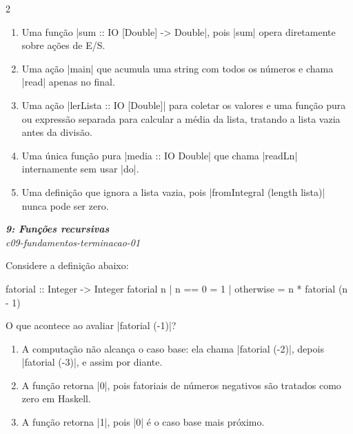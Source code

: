 \documentclass[a4paper,10pt,brazil]{article}
\begin{document}
\begin{multicols}{2}
\begin{enumerate}
  \item Uma função \haskellinline|sum :: IO [Double] -> Double|, pois \haskellinline|sum| opera diretamente sobre ações de E/S.

  \item Uma ação \haskellinline|main| que acumula uma string com todos os números e chama \haskellinline|read| apenas no final.

  \item Uma ação \haskellinline|lerLista :: IO [Double]| para coletar os valores e uma função pura ou expressão separada para calcular a média da lista, tratando a lista vazia antes da divisão.

  \item Uma única função pura \haskellinline|media :: IO Double| que chama \haskellinline|readLn| internamente sem usar \haskellinline|do|.

  \item Uma definição que ignora a lista vazia, pois \haskellinline|fromIntegral (length lista)| nunca pode ser zero.


\end{enumerate}

\begin{flushright}
  \footnotesize
  \textit{\textbf{9: Funções recursivas}}\\
  \textit{c09-fundamentos-terminacao-01}\\

\end{flushright}
Considere a definição abaixo:
\begin{haskellcode}
fatorial :: Integer -> Integer
fatorial n
  | n == 0 = 1
  | otherwise = n * fatorial (n - 1)
\end{haskellcode}
O que acontece ao avaliar \haskellinline|fatorial (-1)|?

\begin{enumerate}
  \item A computação não alcança o caso base: ela chama \haskellinline|fatorial (-2)|, depois \haskellinline|fatorial (-3)|, e assim por diante.

  \item A função retorna \haskellinline|0|, pois fatoriais de números negativos são tratados como zero em Haskell.

  \item A função retorna \haskellinline|1|, pois \haskellinline|0| é o caso base mais próximo.


\end{enumerate}
\end{multicols}
\end{document}
